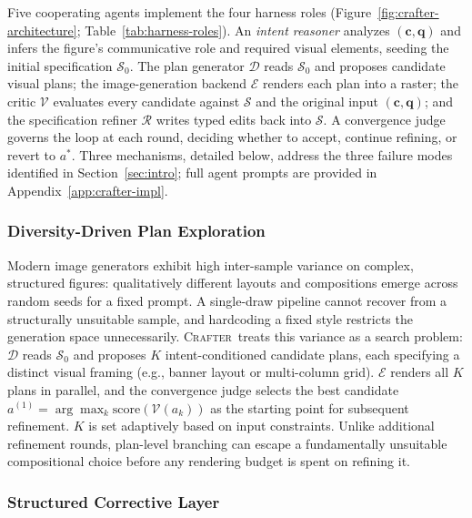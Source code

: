 \documentclass{llmxive}
\providecommand{\Crafter}{\textsc{Crafter}\xspace}
\begin{document}
Five cooperating agents implement the four harness roles (Figure~\ref{fig:crafter-architecture}; Table~\ref{tab:harness-roles}). An \emph{intent reasoner} analyzes $(\mathbf{c}, \mathbf{q})$ and infers the figure's communicative role and required visual elements, seeding the initial specification $\mathcal{S}_0$. The plan generator $\mathcal{D}$ reads $\mathcal{S}_0$ and proposes candidate visual plans; the image-generation backend $\mathcal{E}$ renders each plan into a raster; the critic $\mathcal{V}$ evaluates every candidate against $\mathcal{S}$ and the original input $(\mathbf{c}, \mathbf{q})$; and the specification refiner $\mathcal{R}$ writes typed edits back into $\mathcal{S}$. A convergence judge governs the loop at each round, deciding whether to accept, continue refining, or revert to $a^*$. Three mechanisms, detailed below, address the three failure modes identified in Section~\ref{sec:intro}; full agent prompts are provided in Appendix~\ref{app:crafter-impl}.

\subsubsection{Diversity-Driven Plan Exploration}
\label{sec:method-diversity}

Modern image generators exhibit high inter-sample variance on complex, structured figures: qualitatively different layouts and compositions emerge across random seeds for a fixed prompt. A single-draw pipeline cannot recover from a structurally unsuitable sample, and hardcoding a fixed style restricts the generation space unnecessarily. \Crafter\ treats this variance as a search problem: $\mathcal{D}$ reads $\mathcal{S}_0$ and proposes $K$ intent-conditioned candidate plans, each specifying a distinct visual framing (e.g., banner layout or multi-column grid). $\mathcal{E}$ renders all $K$ plans in parallel, and the convergence judge selects the best candidate $a^{(1)} \!=\! \arg\max_{k} \mathrm{score}(\mathcal{V}(a_k))$ as the starting point for subsequent refinement. $K$ is set adaptively based on input constraints. Unlike additional refinement rounds, plan-level branching can escape a fundamentally unsuitable compositional choice before any rendering budget is spent on refining it.

\subsubsection{Structured Corrective Layer}
\label{sec:method-corrective}
\end{document}
